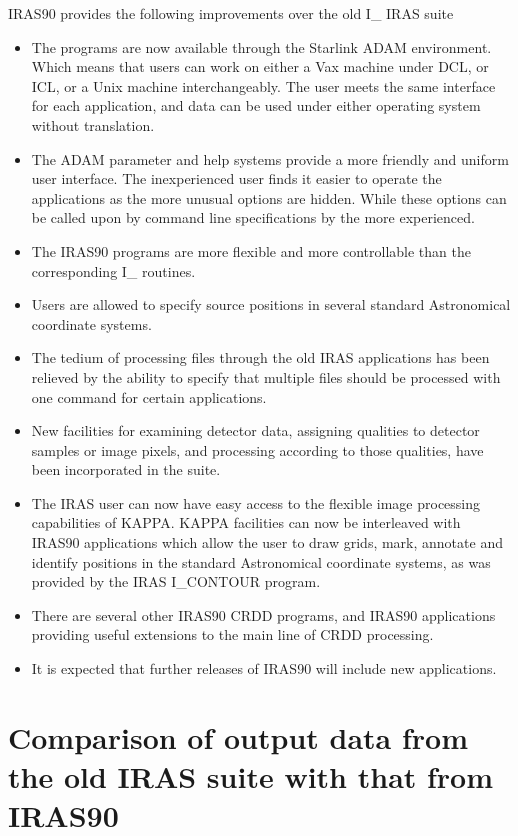 \documentclass[twoside,11pt]{starlink}
\begin{document}
IRAS90 provides the following improvements over the old I\_ IRAS suite
\begin{itemize}
\item The programs are now available through the Starlink ADAM environment.
Which
means that users can work on either a Vax machine under DCL, or ICL, or a Unix
machine interchangeably. The user meets the same interface for each application,
and data can be used under either operating system without translation.
\item The ADAM parameter and help systems provide a more friendly and uniform
user interface. The inexperienced user finds it easier to operate the
applications as the more unusual options are hidden. While these options can
be called upon by command line specifications by the more experienced.
\item The IRAS90 programs are more flexible and more controllable than the
corresponding I\_ routines.
\item Users are allowed to specify source positions in several standard
Astronomical coordinate systems.
\item The tedium of processing files through the old IRAS applications has
been relieved by the ability to specify that multiple files should be processed
with one command for certain applications.
\item New facilities for examining detector data, assigning qualities to
detector samples or image pixels, and processing according to those qualities,
have been incorporated in the suite.
\item The IRAS user can now have easy access to the flexible image processing
capabilities of KAPPA. KAPPA facilities can now be interleaved with IRAS90
applications which allow the user to draw grids, mark, annotate and
identify positions in the standard Astronomical coordinate systems, as was
provided by the IRAS I\_CONTOUR program.
\item There are several other IRAS90 CRDD programs, and IRAS90 applications
providing useful extensions to the main line of CRDD processing.
\item It is expected that further releases of IRAS90 will include new
applications.
\end{itemize}

\section{Comparison of output data from the old IRAS suite with that from
IRAS90
\label{m:oldnew}}
\end{document}
